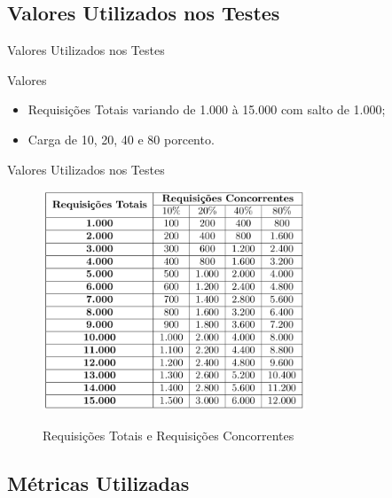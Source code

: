 \subsection*{Valores Utilizados nos Testes}

\begin{frame}{Valores Utilizados nos Testes}
	\begin{block}{Valores}
		\begin{itemize}
			\item Requisições Totais variando de 1.000 à 15.000 com salto de 
			1.000;
			\item Carga de 10, 20, 40 e 80 porcento.
		\end{itemize}
	\end{block}
\end{frame}

\begin{frame}{Valores Utilizados nos Testes}
	\begin{figure}
		\centering
		\caption{Requisições Totais e Requisições Concorrentes}
		\includegraphics[width=0.7\textwidth, 
		height=0.7\textheight]{tabela-requisicoes} \\
	\end{figure}
\end{frame}

\subsection*{Métricas Utilizadas}

